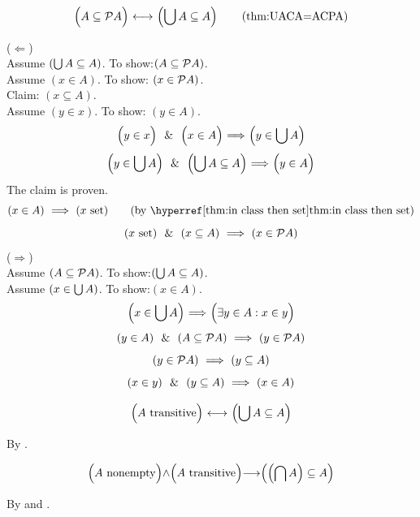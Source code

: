 \begin{theorem}
\[
\left(A\subseteq \power A\middle) \iff \middle(\union A\subseteq A\right)
\labeltagd{thm}{UACA=ACPA}
\]
\end{theorem}
\Proof
\noindent($\Leftarrow$)\\
Assume $(\bigcup A\subseteq A)$. To show:$(A\subseteq \mathcal{P} A)$.\\
Assume $(x\in A)$. To show: $(x\in \mathcal{P} A)$.\\
Claim: $(x\subseteq A)$.\\
Assume $(y\in x)$. To show: $(y\in A)$.
\[
\left(y\in x\middle)
\ \ \&\ \ 
\middle(x\in A\middle)
\ \Longrightarrow\ 
\middle(y\in\bigcup A\right)
\]
\[
\left(y\in\bigcup A\middle)
\ \ \&\ \ 
\middle(\bigcup A\subseteq A\middle)
\ \Longrightarrow\ 
\middle(y\in A\right)
\]
The claim is proven.
\[
(x\in A)
\IMPLIES
(x\set)
\tag{by \myref{thm:in class then set}}
\]
\[
(x\mathrm{\ set})
\ \ \&\ \ 
(x\subseteq A)
\ \Longrightarrow\ 
(x\in\mathcal{P} A)
\]
\noindent($\Rightarrow$)\\
Assume $(A\subseteq \mathcal{P} A)$. To show:$(\bigcup A\subseteq A)$.\\
Assume $(x\in\bigcup A)$. To show:$(x\in A)$.
\[
\left(x\in\bigcup A\middle)
\ \Longrightarrow\ 
\middle(\exists y\in A: x\in y\right)
\]
\[
(y\in A)
\ \ \&\ \ 
(A\subseteq \mathcal{P} A)
\ \Longrightarrow\ 
(y\in \mathcal{P} A)
\]
\[
(y\in \mathcal{P} A)
\ \Longrightarrow\ 
(y\subseteq A)
\]
\[
(x\in y)
\ \ \&\ \ 
(y\subseteq A)
\ \Longrightarrow\ 
(x\in A)
\]
\Done
\begin{theorem}
\[
\left(A \mathrm{\ transitive}\middle){\ \longleftrightarrow\ } \middle(\bigcup A\subseteq A\right)
\]
\label{thm:transitive through union}
\end{theorem}
\Proof
By .
\Done

\begin{theorem}
\[
 \left(A\mathrm{\ nonempty}\middle)
\land
\middle(A\mathrm{\ transitive}\middle)
\longrightarrow
\middle(\left(\bigcap A\right)\subseteq A\right)
\]
\end{theorem}
\Proof
By  and .
\Done



